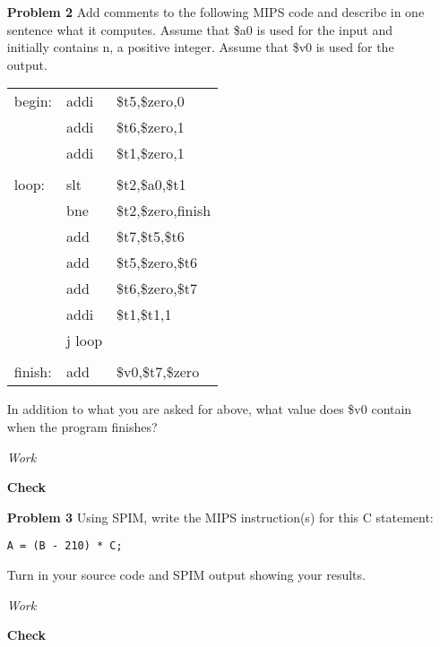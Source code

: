 \documentclass[12pt]{article}
\begin{document}
\begin{enumerate}
  \item[\textbf{Problem 2}] Add comments to the following MIPS code and describe in one sentence what it computes.  Assume that \$a0 is used for the input and initially contains n, a positive integer.  Assume that \$v0 is used for the output.

  \begin{tabular}{>{\ttfamily}p{10em}>{\ttfamily}p{10em}>{\ttfamily}p{10em}}
    begin: & addi	& \$t5,\$zero,0 \\
		& addi	& \$t6,\$zero,1 \\
		& addi	& \$t1,\$zero,1 \\ \tabularnewline
		loop: & slt	& \$t2,\$a0,\$t1 \\
		& bne	& \$t2,\$zero,finish \\
		& add	& \$t7,\$t5,\$t6 \\
		& add	& \$t5,\$zero,\$t6 \\
		& add	& \$t6,\$zero,\$t7 \\
		& addi & \$t1,\$t1,1 \\
		& j	loop & \\ \tabularnewline
		finish: & add	& \$v0,\$t7,\$zero
  \end{tabular}
  \item[] In addition to what you are asked for above, what value does \$v0 contain when the program finishes?
\end{enumerate}



\begin{enumerate}
  \item[\textit{Work}]
  \item[\textbf{Check}]
\end{enumerate}




\begin{enumerate}
  \item[\textbf{Problem 3}] Using SPIM, write the MIPS instruction(s) for this C statement:
		\centerline\texttt{A = (B - 210) * C;}
	\item[]Turn in your source code and SPIM output showing your results.
\end{enumerate}

\begin{enumerate}
  \item[\textit{Work}]
  \item[\textbf{Check}]
\end{enumerate}
\end{document}
